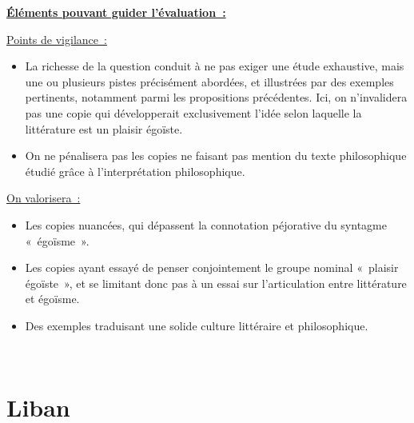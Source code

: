 {\textbf{\underline{Éléments pouvant guider l'évaluation~:}}

\underline{Points de vigilance~:}
\begin{itemize}
\item La richesse de la question conduit à ne pas exiger une étude exhaustive, mais une
ou plusieurs pistes précisément abordées, et illustrées par des exemples pertinents,
notamment parmi les propositions précédentes. Ici, on n'invalidera pas une copie qui
développerait exclusivement l'idée selon laquelle la littérature est un plaisir égoïste.
\item On ne pénalisera pas les copies ne faisant pas mention du texte philosophique étudié
grâce à l'interprétation philosophique.
\end{itemize}

\underline{On valorisera~:}
\begin{itemize}
\item Les copies nuancées, qui dépassent la connotation péjorative du syntagme
«~égoïsme~».
\item Les copies ayant essayé de penser conjointement le groupe nominal «~plaisir
égoïste~», et se limitant donc pas à un essai sur l'articulation entre littérature et
égoïsme.
\item Des exemples traduisant une solide culture littéraire et philosophique.
\end{itemize}}

\vfill{~}\clearpage

\section{Liban}

